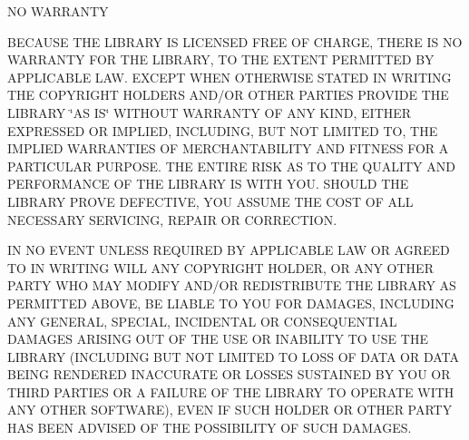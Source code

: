 N\-O W\-A\-R\-R\-A\-N\-T\-Y
\begin{DoxyEnumerate}
\item B\-E\-C\-A\-U\-S\-E T\-H\-E L\-I\-B\-R\-A\-R\-Y I\-S L\-I\-C\-E\-N\-S\-E\-D F\-R\-E\-E O\-F C\-H\-A\-R\-G\-E, T\-H\-E\-R\-E I\-S N\-O W\-A\-R\-R\-A\-N\-T\-Y F\-O\-R T\-H\-E L\-I\-B\-R\-A\-R\-Y, T\-O T\-H\-E E\-X\-T\-E\-N\-T P\-E\-R\-M\-I\-T\-T\-E\-D B\-Y A\-P\-P\-L\-I\-C\-A\-B\-L\-E L\-A\-W. E\-X\-C\-E\-P\-T W\-H\-E\-N O\-T\-H\-E\-R\-W\-I\-S\-E S\-T\-A\-T\-E\-D I\-N W\-R\-I\-T\-I\-N\-G T\-H\-E C\-O\-P\-Y\-R\-I\-G\-H\-T H\-O\-L\-D\-E\-R\-S A\-N\-D/\-O\-R O\-T\-H\-E\-R P\-A\-R\-T\-I\-E\-S P\-R\-O\-V\-I\-D\-E T\-H\-E L\-I\-B\-R\-A\-R\-Y \char`\"{}\-A\-S I\-S\char`\"{} W\-I\-T\-H\-O\-U\-T W\-A\-R\-R\-A\-N\-T\-Y O\-F A\-N\-Y K\-I\-N\-D, E\-I\-T\-H\-E\-R E\-X\-P\-R\-E\-S\-S\-E\-D O\-R I\-M\-P\-L\-I\-E\-D, I\-N\-C\-L\-U\-D\-I\-N\-G, B\-U\-T N\-O\-T L\-I\-M\-I\-T\-E\-D T\-O, T\-H\-E I\-M\-P\-L\-I\-E\-D W\-A\-R\-R\-A\-N\-T\-I\-E\-S O\-F M\-E\-R\-C\-H\-A\-N\-T\-A\-B\-I\-L\-I\-T\-Y A\-N\-D F\-I\-T\-N\-E\-S\-S F\-O\-R A P\-A\-R\-T\-I\-C\-U\-L\-A\-R P\-U\-R\-P\-O\-S\-E. T\-H\-E E\-N\-T\-I\-R\-E R\-I\-S\-K A\-S T\-O T\-H\-E Q\-U\-A\-L\-I\-T\-Y A\-N\-D P\-E\-R\-F\-O\-R\-M\-A\-N\-C\-E O\-F T\-H\-E L\-I\-B\-R\-A\-R\-Y I\-S W\-I\-T\-H Y\-O\-U. S\-H\-O\-U\-L\-D T\-H\-E L\-I\-B\-R\-A\-R\-Y P\-R\-O\-V\-E D\-E\-F\-E\-C\-T\-I\-V\-E, Y\-O\-U A\-S\-S\-U\-M\-E T\-H\-E C\-O\-S\-T O\-F A\-L\-L N\-E\-C\-E\-S\-S\-A\-R\-Y S\-E\-R\-V\-I\-C\-I\-N\-G, R\-E\-P\-A\-I\-R O\-R C\-O\-R\-R\-E\-C\-T\-I\-O\-N.
\item I\-N N\-O E\-V\-E\-N\-T U\-N\-L\-E\-S\-S R\-E\-Q\-U\-I\-R\-E\-D B\-Y A\-P\-P\-L\-I\-C\-A\-B\-L\-E L\-A\-W O\-R A\-G\-R\-E\-E\-D T\-O I\-N W\-R\-I\-T\-I\-N\-G W\-I\-L\-L A\-N\-Y C\-O\-P\-Y\-R\-I\-G\-H\-T H\-O\-L\-D\-E\-R, O\-R A\-N\-Y O\-T\-H\-E\-R P\-A\-R\-T\-Y W\-H\-O M\-A\-Y M\-O\-D\-I\-F\-Y A\-N\-D/\-O\-R R\-E\-D\-I\-S\-T\-R\-I\-B\-U\-T\-E T\-H\-E L\-I\-B\-R\-A\-R\-Y A\-S P\-E\-R\-M\-I\-T\-T\-E\-D A\-B\-O\-V\-E, B\-E L\-I\-A\-B\-L\-E T\-O Y\-O\-U F\-O\-R D\-A\-M\-A\-G\-E\-S, I\-N\-C\-L\-U\-D\-I\-N\-G A\-N\-Y G\-E\-N\-E\-R\-A\-L, S\-P\-E\-C\-I\-A\-L, I\-N\-C\-I\-D\-E\-N\-T\-A\-L O\-R C\-O\-N\-S\-E\-Q\-U\-E\-N\-T\-I\-A\-L D\-A\-M\-A\-G\-E\-S A\-R\-I\-S\-I\-N\-G O\-U\-T O\-F T\-H\-E U\-S\-E O\-R I\-N\-A\-B\-I\-L\-I\-T\-Y T\-O U\-S\-E T\-H\-E L\-I\-B\-R\-A\-R\-Y (I\-N\-C\-L\-U\-D\-I\-N\-G B\-U\-T N\-O\-T L\-I\-M\-I\-T\-E\-D T\-O L\-O\-S\-S O\-F D\-A\-T\-A O\-R D\-A\-T\-A B\-E\-I\-N\-G R\-E\-N\-D\-E\-R\-E\-D I\-N\-A\-C\-C\-U\-R\-A\-T\-E O\-R L\-O\-S\-S\-E\-S S\-U\-S\-T\-A\-I\-N\-E\-D B\-Y Y\-O\-U O\-R T\-H\-I\-R\-D P\-A\-R\-T\-I\-E\-S O\-R A F\-A\-I\-L\-U\-R\-E O\-F T\-H\-E L\-I\-B\-R\-A\-R\-Y T\-O O\-P\-E\-R\-A\-T\-E W\-I\-T\-H A\-N\-Y O\-T\-H\-E\-R S\-O\-F\-T\-W\-A\-R\-E), E\-V\-E\-N I\-F S\-U\-C\-H H\-O\-L\-D\-E\-R O\-R O\-T\-H\-E\-R P\-A\-R\-T\-Y H\-A\-S B\-E\-E\-N A\-D\-V\-I\-S\-E\-D O\-F T\-H\-E P\-O\-S\-S\-I\-B\-I\-L\-I\-T\-Y O\-F S\-U\-C\-H D\-A\-M\-A\-G\-E\-S.
\end{DoxyEnumerate}

